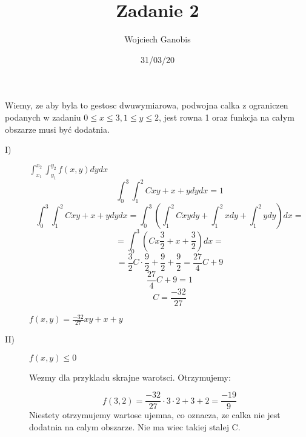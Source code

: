 \documentclass[12pt]{article}
\title{Zadanie 2}
\author{Wojciech Ganobis}
\date{31/03/20}
\begin{document}
\maketitle
 Wiemy, ze aby byla to gestosc dwuwymiarowa, podwojna calka z ograniczen podanych w zadaniu $0 \leq x \leq 3, 1 \leq y \leq 2$, jest rowna 1 oraz funkcja na całym obszarze musi być dodatnia.

\begin{description}
\item[I)]
$\int_{x_{1}}^{x_{2}} \int_{y_{1}}^{y_{2}} f(x,y) dy dx$
$$\int_0^3 \int_1^2 Cxy+x+y dy dx = 1$$
$$\int_0^3 \int_1^2 Cxy+x+y dy dx = \int_0^3 \left( \int_1^2 Cxy dy + \int_1^2x dy + \int_1^2 y dy \right) dx =$$
$$ = \int_0^3 \left( Cx\frac{3}{2} + x + \frac{3}{2} \right) dx =$$
$$=\frac{3}{2}C \cdot \frac{9}{2} +\frac{9}{2} + \frac{9}{2} = \frac{27}{4}C + 9$$
$$\frac{27}{4}C + 9 = 1$$
$$C=\frac{-32}{27} $$

$f(x,y) = \frac{-32}{27}xy + x + y$

\item[II)]
$f(x,y) \leq 0$

Wezmy dla przykladu skrajne warotsci. Otrzymujemy:

$$f(3,2) = \frac{-32}{27} \cdot 3 \cdot 2 + 3 + 2 = \frac{-19}{9}$$
Niestety otrzymujemy wartosc ujemna, co oznacza, ze calka nie jest dodatnia na calym obszarze. Nie ma wiec takiej stalej C.
\end{description}
  
\end{document}
